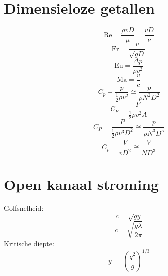 	\section{Dimensieloze getallen}
\begin{multicols}{2}
	\begin{equation}
		\text{Re} = \frac{\rho v D}{\mu} = \frac{v D}{\nu}
	\end{equation}
	\begin{equation}
		\text{Fr} = \frac{v}{\sqrt{g D}}
	\end{equation}
	\begin{equation}
		\text{Eu} = \frac{\Delta p}{\rho v^2}
	\end{equation}
	\begin{equation}
		\text{Ma} = \frac{v}{c}
	\end{equation}
	\begin{equation}
		C_p = \frac{p}{\frac{1}{2}\rho v^2} \cong \frac{p}{\rho N^2 D^2}
	\end{equation}
	\begin{equation}
		C_F = \frac{F}{\frac{1}{2}\rho v^2 A}
	\end{equation}
	\begin{equation}
		C_P = \frac{P}{\frac{1}{2}\rho v^3 D^2} \cong \frac{p}{\rho N^3 D^5}
	\end{equation}
	\begin{equation}
		C_p = \frac{\dot{V}}{v D^2} \cong \frac{\dot{V}}{N D^3}
	\end{equation}
\end{multicols}
	\section{Open kanaal stroming}
\begin{multicols}{2}
	Golfsnelheid:
	\begin{equation}
		c = \sqrt{gy}
	\end{equation}
	\begin{equation}
		c = \sqrt{\frac{g\lambda}{2\pi}}
	\end{equation}
	Kritische diepte:
	\begin{equation}
		y_c = \left(\frac{q^2}{g}\right)^{1/3}
	\end{equation}
\end{multicols}
